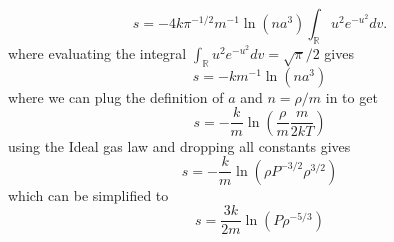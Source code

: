 \documentclass[11pt]{article}
\begin{document}
\begin{enumerate}[label=\alph*)]
      \begin{equation}
         s = -4 k \pi^{-1/2}m^{-1} \ln \left (n a^{3} \right) \int_{\mathbb{R}} u^{2} e^{-u^{2}} dv .
      \end{equation}
      where evaluating the integral $\int_{\mathbb{R}} u^{2} e^{-u^{2}} dv = \sqrt{\pi} / 2$ gives
      \begin{equation}
         s = - k m^{-1} \ln \left (n a^{3} \right)
      \end{equation}
      where we can plug the definition of $a$ and $n = \rho / m$ in to get
      \begin{equation}
         s = - \frac{k}{m} \ln \left (\frac{\rho}{m} \frac{m}{2kT} \right)
      \end{equation}
      using the Ideal gas law and dropping all constants gives
      \begin{equation}
         s = - \frac{k}{m} \ln \left (\rho P^{-3/2} \rho^{3/2} \right )
      \end{equation}
      which can be simplified to
      \begin{equation}
         s = \frac{3k}{2m} \ln \left ( P \rho^{-5/3} \right )
      \end{equation}

 \end{enumerate}
\end{document}
